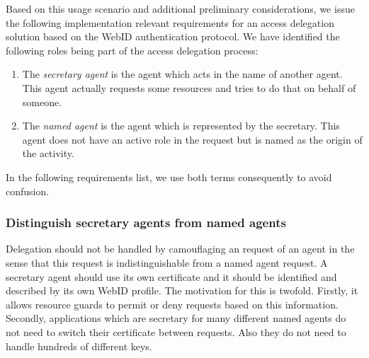 \documentclass[a4paper]{llncs}
\begin{document}




Based on this usage scenario and additional preliminary considerations, we issue the following implementation relevant requirements for an access delegation solution based on the WebID authentication protocol.
We have identified the following roles being part of the access delegation process:
\begin{enumerate}
    \item The \textit{secretary agent} is the agent which acts in the name of another agent.
This agent actually requests some resources and tries to do that on behalf of someone.
    \item The \textit{named agent} is the agent which is represented by the secretary.
This agent does not have an active role in the request but is named as the origin of the activity.
\end{enumerate}
In the following requirements list, we use both terms consequently to avoid confusion.

\subsubsection{Distinguish secretary agents from named agents}
Delegation should not be handled by camouflaging an request of an agent in the sense that this request is indistinguishable from a named agent request.
A secretary agent should use its own certificate and it should be identified and described by its own WebID profile.
The motivation for this is twofold.
Firstly, it allows resource guards to permit or deny requests based on this information.
Secondly, applications which are secretary for many different named agents do not need to switch their certificate between requests.
Also they do not need to handle hundreds of different keys.
\end{document}
